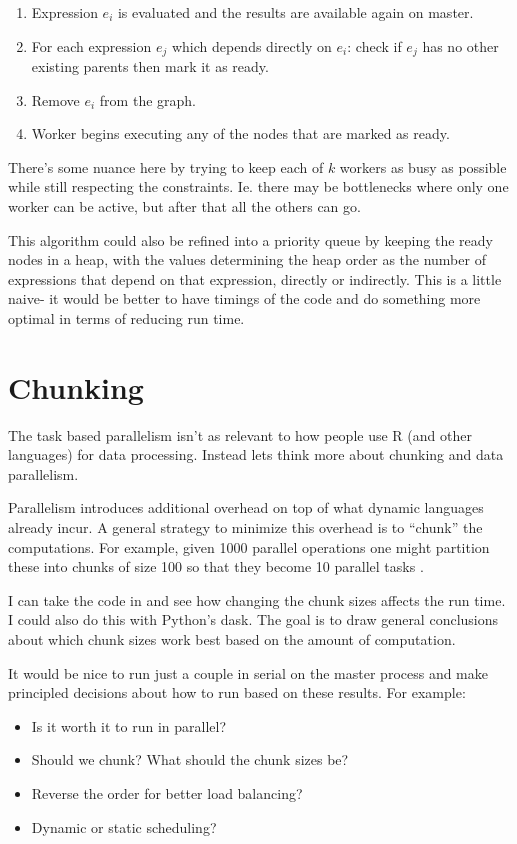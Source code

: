 \documentclass[12pt]{article}
\begin{document}
\begin{enumerate}
    \item Expression $e_i$ is evaluated and the results are available again
        on master.
    \item For each expression $e_j$ which depends directly on $e_i$: check
        if $e_j$ has no other existing parents then mark it as ready.
    \item Remove $e_i$ from the graph.
    \item Worker begins executing any of the nodes that are marked as ready.
\end{enumerate}

There's some nuance here by trying to keep each of $k$ workers as busy as
possible while still respecting the constraints. Ie. there may be
bottlenecks where only one worker can be active, but after that all the
others can go.

This algorithm could also be refined into a priority queue by keeping the ready
nodes in a heap, with the values determining the heap order as the number
of expressions that depend on that expression, directly or indirectly. This
is a little naive- it would be better to have timings of the code and do
something more optimal in terms of reducing run time.

\newpage
\newpage

\section{Chunking}

The task based parallelism isn't as relevant to how people use R (and other
languages) for data processing. Instead
lets think more about chunking and data parallelism. 

Parallelism introduces additional overhead on top of what dynamic languages
already incur. A general strategy to minimize this overhead is to ``chunk''
the computations. For example, given 1000 parallel operations one might
partition these into chunks of size 100 so that they become 10 parallel
tasks \cite{matloff2015parallel}.

I can take the code in \cite{matloff2015parallel} and see how changing the
chunk sizes affects the run time. I could also do this with Python's dask.
The goal is to draw general conclusions about which chunk sizes work best
based on the amount of computation.

It would be nice to run just a couple in serial on the master process and
make principled decisions about how to run based on these results. For
example:
\begin{itemize}
    \item Is it worth it to run in parallel?
    \item Should we chunk? What should the chunk sizes be?
    \item Reverse the order for better load balancing?
    \item Dynamic or static scheduling?
\end{itemize}
\end{document}
